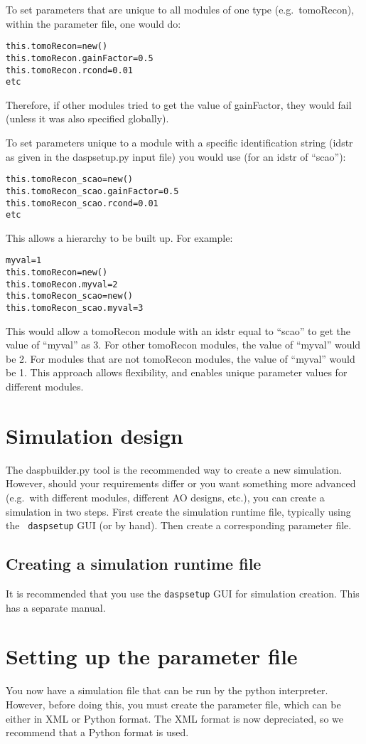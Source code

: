 \documentclass{article}
\begin{document}
To set parameters that are unique to all modules of one type
(e.g.\ tomoRecon), within the parameter file, one would do:
\begin{verbatim}
this.tomoRecon=new()
this.tomoRecon.gainFactor=0.5
this.tomoRecon.rcond=0.01
etc
\end{verbatim}
Therefore, if other modules tried to get the value of gainFactor, they
would fail (unless it was also specified globally).

To set parameters unique to a module with a specific identification
string (idstr as given in the daspsetup.py input file) you would use
(for an idstr of ``scao''):
\begin{verbatim}
this.tomoRecon_scao=new()
this.tomoRecon_scao.gainFactor=0.5
this.tomoRecon_scao.rcond=0.01
etc
\end{verbatim}

This allows a hierarchy to be built up.  For example:
\begin{verbatim}
myval=1
this.tomoRecon=new()
this.tomoRecon.myval=2
this.tomoRecon_scao=new()
this.tomoRecon_scao.myval=3
\end{verbatim}
This would allow a tomoRecon module with an idstr equal to ``scao'' to
get the value of ``myval'' as 3.  For other tomoRecon modules, the
value of ``myval'' would be 2.  For modules that are not tomoRecon
modules, the value of ``myval'' would be 1.  This approach allows
flexibility, and enables unique parameter values for different modules.



\section{Simulation design}
The daspbuilder.py tool is the recommended way to create a new
simulation.  However, should your requirements differ or you want
something more advanced (e.g.\ with different modules, different AO
designs, etc.), you can create a simulation in two steps.  First
create the simulation runtime file, typically using the {\tt
  daspsetup} GUI (or by hand).  Then create a corresponding parameter
file.

\subsection{Creating a simulation runtime file}
It is recommended that you use the \texttt{daspsetup} GUI for
simulation creation.  This has a separate manual.  

\section{Setting up the parameter file}
\label{sect:paramfile}
You now have a simulation file that can be run by the python
interpreter.  However, before doing this, you must create the
parameter file, which can be either in XML or Python format.  The XML
format is now depreciated, so we recommend that a Python format is used.
\end{document}
